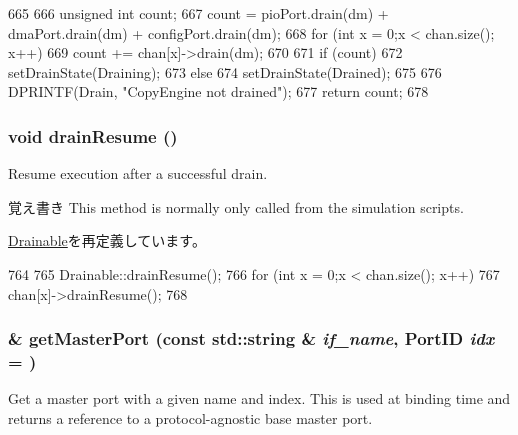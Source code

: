 \begin{DoxyCode}
665 {
666     unsigned int count;
667     count = pioPort.drain(dm) + dmaPort.drain(dm) + configPort.drain(dm);
668     for (int x = 0;x < chan.size(); x++)
669         count += chan[x]->drain(dm);
670 
671     if (count)
672         setDrainState(Draining);
673     else
674         setDrainState(Drained);
675 
676     DPRINTF(Drain, "CopyEngine not drained\n");
677     return count;
678 }
\end{DoxyCode}
\hypertarget{classCopyEngine_a8f020d3237536fe007fc488c4125c5d8}{
\subsubsection[{drainResume}]{\setlength{\rightskip}{0pt plus 5cm}void drainResume ()}}
\label{classCopyEngine_a8f020d3237536fe007fc488c4125c5d8}
Resume execution after a successful drain.

\begin{DoxyNote}{覚え書き}
This method is normally only called from the simulation scripts. 
\end{DoxyNote}


\hyperlink{classDrainable_a8f020d3237536fe007fc488c4125c5d8}{Drainable}を再定義しています。


\begin{DoxyCode}
764 {
765     Drainable::drainResume();
766     for (int x = 0;x < chan.size(); x++)
767         chan[x]->drainResume();
768 }
\end{DoxyCode}
\hypertarget{classCopyEngine_adc4e675e51defbdd1e354dac729d0703}{
\subsubsection[{getMasterPort}]{ \& getMasterPort (const std::string \& {\em if\_\-name}, \/  {\bf PortID} {\em idx} = {})}}
\label{classCopyEngine_adc4e675e51defbdd1e354dac729d0703}
Get a master port with a given name and index. This is used at binding time and returns a reference to a protocol-\/agnostic base master port.


